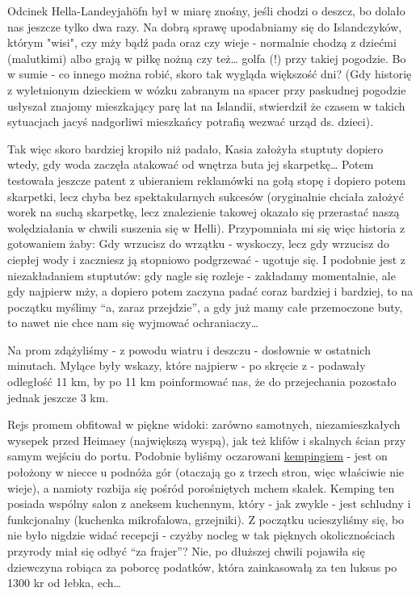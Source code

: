
Odcinek Hella-Landeyjahöfn był w miarę znośny, jeśli chodzi o deszcz, bo dolało nas jeszcze tylko dwa razy. Na dobrą sprawę upodabniamy się do Islandczyków, którym "wisi", czy mży bądź pada oraz czy wieje - normalnie chodzą z dziećmi (malutkimi) albo grają w piłkę nożną czy też… golfa (!) przy takiej pogodzie. Bo w sumie - co innego można robić, skoro tak wygląda większość dni? (Gdy historię z wyletnionym dzieckiem w wózku zabranym na spacer przy paskudnej pogodzie usłyszał znajomy mieszkający parę lat na Islandii, stwierdził że czasem w takich sytuacjach jacyś nadgorliwi mieszkańcy potrafią wezwać urząd ds. dzieci).

Tak więc skoro bardziej kropiło niż padało, Kasia założyła stuptuty dopiero wtedy, gdy woda zaczęła atakować od wnętrza buta jej skarpetkę… Potem testowała jeszcze patent z ubieraniem reklamówki na gołą stopę i dopiero potem skarpetki, lecz chyba bez spektakularnych sukcesów (oryginalnie chciała założyć worek na suchą skarpetkę, lecz znalezienie takowej okazało się przerastać naszą wolędziałania w chwili suszenia się w Helli). Przypomniała mi się więc historia z gotowaniem żaby: Gdy wrzucisz do wrzątku - wyskoczy, lecz gdy wrzucisz do ciepłej wody i zaczniesz ją stopniowo podgrzewać - ugotuje się. I podobnie jest z niezakładaniem stuptutów: gdy nagle się rozleje - zakładamy momentalnie, ale gdy najpierw mży, a dopiero potem zaczyna padać coraz bardziej i bardziej, to na początku myślimy “a, zaraz przejdzie”, a gdy już mamy całe przemoczone buty, to nawet nie chce nam się wyjmować ochraniaczy…

Na prom zdążyliśmy - z powodu wiatru i deszczu - dosłownie w ostatnich minutach. Mylące były wskazy, które najpierw - po skręcie z  - podawały odległość 11 km, by po 11 km poinformować nas, że do przejechania pozostało jednak jeszcze 3 km.


Rejs promem obfitował w piękne widoki: zarówno samotnych, niezamieszkałych wysepek przed Heimaey (największą wyspą), jak też klifów i skalnych ścian przy samym wejściu do portu. Podobnie byliśmy oczarowani \href{http://www.tjalda.is/en/herjolfsdalur/}{kempingiem} - jest on położony w niecce u podnóża gór (otaczają go z trzech stron, więc właściwie nie wieje), a namioty rozbija się pośród porośniętych mchem skałek. Kemping ten posiada wspólny salon z aneksem kuchennym, który - jak zwykle - jest schludny i funkcjonalny (kuchenka mikrofalowa, grzejniki). Z początku ucieszyliśmy się, bo nie było nigdzie widać recepcji - czyżby nocleg w tak pięknych okolicznościach przyrody miał się odbyć “za frajer”? Nie, po dłuższej chwili pojawiła się dziewczyna robiąca za poborcę podatków, która zainkasowałą za ten luksus po 1300 kr od łebka, ech…

